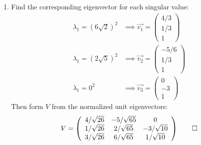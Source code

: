 \documentclass[12pt, a4paper]{article}
\begin{document}
\begin{enumerate}[Q\arabic*.]
\begin{enumerate}[(\alph*)]
      \item Find the corresponding eigenvector for each singular value:
        \begin{align*}
          \lambda_1 = (6\sqrt{2})^2 &\implies \vec{v_1} = \left(\begin{array}{c} 4/3\\ 1/3\\ 1 \end{array}\right)\\
          \lambda_1 = (2\sqrt{5})^2 &\implies \vec{v_2} = \left(\begin{array}{c} -5/6\\ 1/3\\ 1 \end{array}\right)\\
          \lambda_1 = 0^2 &\implies \vec{v_3} = \left(\begin{array}{c} 0\\ -3\\ 1 \end{array}\right)
        \end{align*}
        Then form $V$ from the normalized unit eigenvectors:
        \begin{align*}
          V = \left(\begin{array}{ccc} 4/\sqrt{26} & -5 /\sqrt{65} & 0\\ 1 /\sqrt{26} & 2 /\sqrt{65} & -3 /\sqrt{10}\\ 3 /\sqrt{26} & 6 /\sqrt{65} & 1 /\sqrt{10} \end{array}\right) \qed
        \end{align*}


\end{enumerate}
\end{enumerate}
\end{document}
